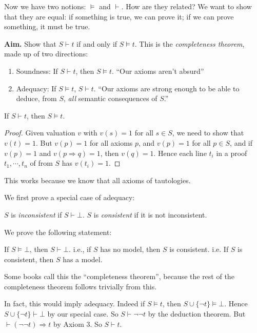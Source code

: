 \documentclass[a4paper]{article}
\begin{document}
Now we have two notions: $\models$ and $\vdash$. How are they related? We want to show that they are equal: if something is true, we can prove it; if we can prove something, it must be true.

\noindent\textbf{Aim.} Show that $S\vdash t$ if and only if $S\models t$.
This is the \emph{completeness theorem}, made up of two directions:
\begin{enumerate}
  \item Soundness: If $S\vdash t$, then $S\models t$. ``Our axioms aren't absurd''
  \item Adequacy: If $S\models t$, $S\vdash t$.  ``Our axioms are strong enough to be able to deduce, from $S$, \emph{all} semantic consequences of $S$.''
\end{enumerate}

\begin{prop}
  If $S\vdash t$, then $S\models t$.
\end{prop}

\begin{proof}
  Given valuation $v$ with $v(s) = 1$ for all $s\in S$, we need to show that $v(t) = 1$. But $v(p) = 1$ for all axioms $p$, and $v(p) = 1$ for all $p\in S$, and if $v(p) = 1$ and $v(p\Rightarrow q) = 1$, then $v(q) = 1$. Hence each line $t_i$ in a proof $t_1, \cdots, t_n$ of from $S$ has $v(t_i) = 1$. 
\end{proof}
This works because we know that all axioms of tautologies.

We first prove a special case of adequacy:
\begin{defi}[Consistent]
  $S$ is \emph{inconsistent} if $S\vdash \bot$. $S$ is \emph{consistent} if it is not inconsistent.
\end{defi}

We prove the following statement:
\begin{thm}
  If $S\models \bot$, then $S\vdash \bot$. i.e., if $S$ has no model, then $S$ is consistent. i.e. If $S$ is consistent, then $S$ has a model.

  \note Some books call this the ``completeness theorem'', because the rest of the completeness theorem follows trivially from this. 
\end{thm}

In fact, this would imply adequacy. Indeed if $S\models t$, then  $S\cup \{\neg t\}\models \bot$. Hence $S\cup \{\neg t\}\vdash \bot$ by our special case. So $S\vdash \neg \neg t$ by the deduction theorem. But $\vdash (\neg\neg t)\Rightarrow t$ by Axiom 3. So $S\vdash t$.
\end{document}

